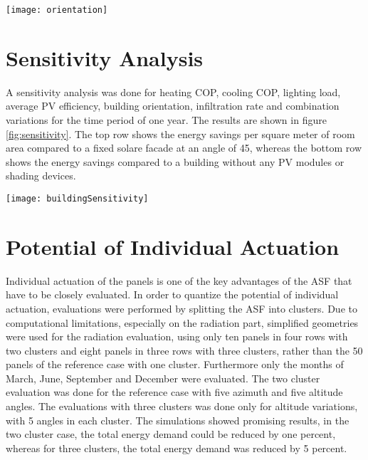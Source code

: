 	\begin{figure*}
	\begin{center}
	\texttt{[image: orientation]}
	\caption{Energy demand in dependence of building orientation. South facing facades perform best.}
	\label{fig:buildingOrientation}
	\end{center}
	\end{figure*}

\section{Sensitivity Analysis}

	A sensitivity analysis was done for heating COP, cooling COP, lighting load, average PV efficiency, building orientation, infiltration rate and combination variations for the time period of one year. The results are shown in figure \ref{fig:sensitivity}. The top row shows the energy savings per square meter of room area compared to a fixed solare facade at an angle of 45\degree, whereas the bottom row shows the energy savings compared to a building without any PV modules or shading devices. 

	\begin{figure*}
	\begin{center}
	\texttt{[image: buildingSensitivity]}
	\caption{Sensitivity analysis of energy savings during one year. From left to right, sensitivities on heating COP, cooling COP, lighting load, average PV efficiency, building orientation, combination variations and infiltration rate. Top row shows the energy savings compared to a fixed solar facade at a 45\degree altitude angle, the bottom row shows the energy savings compared to a room without shading or PV modules.}
	\label{fig:sensitivity}
	\end{center}
	\end{figure*}

\section{Potential of Individual Actuation}
	Individual actuation of the panels is one of the key advantages of the ASF that have to be closely evaluated. In order to quantize the potential of individual actuation, evaluations were performed by splitting the ASF into clusters. Due to computational limitations, especially on the radiation part, simplified geometries were used for the radiation evaluation, using only ten panels in four rows with two clusters and eight panels in three rows with three clusters, rather than the 50 panels of the reference case with one cluster. Furthermore only the months of March, June, September and December were evaluated. The two cluster evaluation was done for the reference case with five azimuth and five altitude angles. The evaluations with three clusters was done only for altitude variations, with 5 angles in each cluster. The simulations showed promising results, in the two cluster case, the total energy demand could be reduced by one percent, whereas for three clusters, the total energy demand was reduced by 5 percent. 
